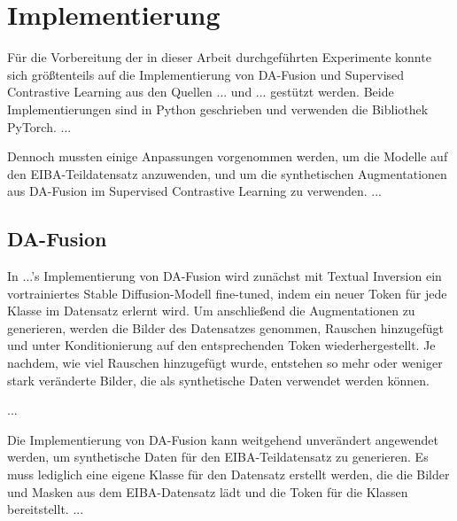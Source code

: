 \section{Implementierung}


Für die Vorbereitung der in dieser Arbeit durchgeführten Experimente konnte sich größtenteils auf die Implementierung von DA-Fusion und Supervised Contrastive Learning aus den Quellen ... und ... gestützt werden. Beide Implementierungen sind in Python geschrieben und verwenden die Bibliothek PyTorch. ...

Dennoch mussten einige Anpassungen vorgenommen werden, um die Modelle auf den EIBA-Teildatensatz anzuwenden, und um die synthetischen Augmentationen aus DA-Fusion im Supervised Contrastive Learning zu verwenden. ...

\subsection{DA-Fusion}

In ...'s Implementierung von DA-Fusion wird zunächst mit Textual Inversion ein vortrainiertes Stable Diffusion-Modell fine-tuned, indem ein neuer Token für jede Klasse im Datensatz erlernt wird. Um anschließend die Augmentationen zu generieren, werden die Bilder des Datensatzes genommen, Rauschen hinzugefügt und unter Konditionierung auf den entsprechenden Token wiederhergestellt. Je nachdem, wie viel Rauschen hinzugefügt wurde, entstehen so mehr oder weniger stark veränderte Bilder, die als synthetische Daten verwendet werden können.

...

Die Implementierung von DA-Fusion kann weitgehend unverändert angewendet werden, um synthetische Daten für den EIBA-Teildatensatz zu generieren. Es muss lediglich eine eigene Klasse für den Datensatz erstellt werden, die die Bilder und Masken aus dem EIBA-Datensatz lädt und die Token für die Klassen bereitstellt. ...

